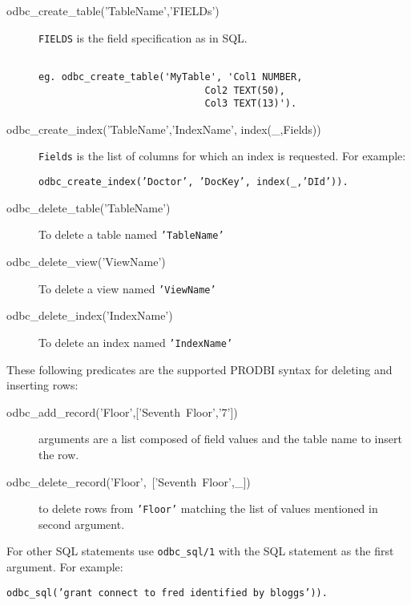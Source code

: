 \begin{description}

\item[odbc\_create\_table('TableName','FIELDs')]
        {\tt FIELDS} is the field specification as in SQL.
\begin{verbatim}

eg. odbc_create_table('MyTable', 'Col1 NUMBER,
                             Col2 TEXT(50),
                             Col3 TEXT(13)').
\end{verbatim}


\item[odbc\_create\_index('TableName','IndexName', index(\_,Fields))]
        {\tt Fields} is the list of columns for which an index
        is requested.  For example:
\begin{center}

{\tt odbc\_create\_index('Doctor', 'DocKey', index(\_,'DId')).}
\end{center}

\item[odbc\_delete\_table('TableName')] To delete a table named {\tt 'TableName'}

\item[odbc\_delete\_view('ViewName')] To delete a view named {\tt 'ViewName'}

\item[odbc\_delete\_index('IndexName')] To delete an index named {\tt 'IndexName'}
\end{description}

These following predicates are the supported PRODBI syntax for deleting and 
inserting rows:
\begin{description}

\item[\mbox{odbc\_add\_record('Floor',['Seventh Floor','7'])}]
         arguments are a list composed of field values and the table name to
         insert the row.

\item[\mbox{odbc\_delete\_record('Floor', ['Seventh Floor',\_])}]
         to delete rows from {\tt 'Floor'} matching the list of values mentioned in
         second argument. 
\end{description}

For other SQL statements use {\tt odbc\_sql/1} with the SQL statement as the 
     first argument.  For example:
\begin{center}
{\tt odbc\_sql('grant connect to fred identified by bloggs')).}
\end{center}

